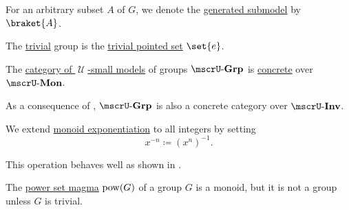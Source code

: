 \begin{definition}
\begin{thmenum}
    For an arbitrary subset \( A \) of \( G \), we denote the \hyperref[def:first_order_generated_substructure]{generated submodel} by \( \braket{ A } \).

     The \hyperref[thm:substructures_form_complete_lattice/bottom]{trivial} group is the \hyperref[def:pointed_set/trivial]{trivial pointed set} \( \set{ e } \).

     The \hyperref[def:category_of_small_first_order_models]{category of \( \mscrU \)-small models} of groups \( \ucat{Grp} \) is \hyperref[def:concrete_category]{concrete} over \hyperref[def:monoid]{\( \ucat{Mon} \)}.

    As a consequence of , \( \ucat{Grp} \) is also a concrete category over \( \ucat{Inv} \).

     We extend \hyperref[def:monoid/exponentiation]{monoid exponentiation} to all integers by setting
    \begin{equation*}
      x^{-n} \coloneqq (x^n)^{-1}.
    \end{equation*}

    This operation behaves well as shown in .
  \end{thmenum}
\end{definition}

\begin{example}\label{ex:power_set_is_not_a_group}
  The \hyperref[def:magma/power_set]{power set magma} \( \operatorname{pow}(G) \) of a group \( G \) is a monoid, but it is not a group unless \( G \) is trivial.
\end{example}

